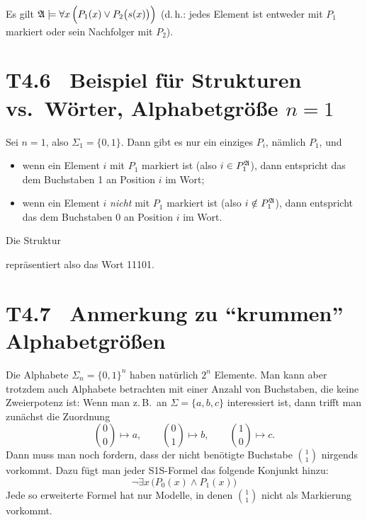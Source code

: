 \documentclass[fontsize=11pt, twoside=false, numbers=autoenddot]{scrbook}
\begin{document}
Es gilt $\mathfrak{A} \models \forall x\,\Big(P_1(x) \lor P_2\big(s(x)\big)\Big)$
(d.\,h.: jedes Element ist entweder mit $P_1$ markiert oder sein Nachfolger mit $P_2$).

\section*{T4.6~ Beispiel für Strukturen vs.\ Wörter, Alphabetgröße {\boldmath $n=1$}}

Sei $n=1$, also $\Sigma_1 = \{0,1\}$. Dann gibt es nur ein einziges $P_i$, nämlich $P_1$, und
%
\begin{itemize}
  \item
    wenn ein Element $i$ mit $P_1$ markiert ist (also $i \in P_1^\mathfrak{A}$),
    dann entspricht das dem Buchstaben 1 an Position $i$ im Wort;
  \item
    wenn ein Element $i$ \emph{nicht} mit $P_1$ markiert ist (also $i \notin P_1^\mathfrak{A}$),
    dann entspricht das dem Buchstaben 0 an Position $i$ im Wort.
\end{itemize}
%
Die Struktur
\begin{center}
\end{center}
repräsentiert also das Wort 11101.

\section*{T4.7~ Anmerkung zu "`krummen"' Alphabetgrößen}

Die Alphabete $\Sigma_n = \{0,1\}^n$ haben natürlich $2^n$ Elemente.
Man kann aber trotzdem auch Alphabete betrachten mit einer Anzahl von Buchstaben, die keine Zweierpotenz ist:
Wenn man z.\,B.\ an $\Sigma = \{a,b,c\}$ interessiert ist,
dann trifft man zunächst die Zuordnung
\[
  \binom00 \mapsto a,\qquad
  \binom01 \mapsto b,\qquad
  \binom10 \mapsto c.
\]
Dann muss man noch fordern, dass der nicht benötigte Buchstabe $\binom11$ nirgends vorkommt.
Dazu fügt man jeder S1S-Formel das folgende Konjunkt hinzu:
\[
  \lnot \exists x\, \Big(P_0(x) \land P_1(x)\Big)
\]
Jede so erweiterte Formel hat nur Modelle, in denen $\binom11$ nicht als Markierung vorkommt.
\end{document}
